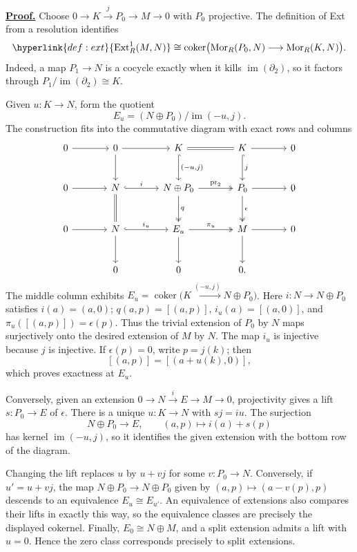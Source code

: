 \documentclass[11pt]{article}
\makeatletter
\newcommand{\afterblock}{\@afterindentfalse\@afterheading}
\newenvironment{demonstration}[1]{\par\noindent\hypertarget{proof:#1}{}{\color{burgundy}\hypersetup{linkcolor=burgundy}\hyperlink{#1}{\textbf{Proof.}}}\quad\ignorespaces}{\unskip\nobreak\hfill\qedsymbol\par\addvspace{5pt}\afterblock}
\newcommand{\usedby}[1]{\par\noindent{\small\textbf{Used in:} #1.}\par\afterblock}
\newcommand{\Mor}{\operatorname{Mor}}
\newcommand{\Extn}[3]{\hyperlink{def:ext}{\operatorname{Ext}^{#1}_{R}(#2,#3)}}
\newcommand{\im}{\operatorname{im}}
\newcommand{\coker}{\operatorname{coker}}
\makeatother
\begin{document}
\begin{demonstration}{thm:extensions}
Choose $0\to K\xrightarrow{j}P_0\to M\to0$ with $P_0$ projective. The definition of Ext from a resolution identifies
\begin{equation}
\label{eq:ext1-coker}\Extn{1}{M}{N}\cong
\coker\bigl(\Mor_R(P_0,N)\longrightarrow\Mor_R(K,N)\bigr).
\end{equation}
Indeed, a map $P_1\to N$ is a cocycle exactly when it kills $\im(\partial_2)$, so it factors through $P_1/\im(\partial_2)\cong K$.

Given $u:K\to N$, form the quotient
\[
E_u=(N\oplus P_0)/\im(-u,j).
\]
The construction fits into the commutative diagram with exact rows and columns
\[
\begin{tikzcd}[column sep=large,row sep=large]
0 \arrow[r] & 0 \arrow[r] \arrow[d]
& K \arrow[r,equal] \arrow[d,hook,"{(-u,j)}"]
& K \arrow[r] \arrow[d,hook,"j"] & 0\\
0 \arrow[r] & N \arrow[r,hook,"i"] \arrow[d,equal]
& N\oplus P_0 \arrow[r,two heads,"\mathrm{pr}_2"] \arrow[d,two heads,"q"]
& P_0 \arrow[r] \arrow[d,two heads,"\epsilon"] & 0\\
0 \arrow[r] & N \arrow[r,hook,"i_u"] \arrow[d]
& E_u \arrow[r,two heads,"\pi_u"] \arrow[d]
& M \arrow[r] \arrow[d] & 0\\
& 0 & 0 & 0.
\end{tikzcd}
\]
The middle column exhibits $E_u=\coker\bigl(K\xrightarrow{(-u,j)}N\oplus P_0\bigr)$. Here $i:N\to N\oplus P_0$ satisfies $i(a)=(a,0)$; $q(a,p)=[(a,p)]$, $i_u(a)=[(a,0)]$, and $\pi_u([(a,p)])=\epsilon(p)$. Thus the trivial extension of $P_0$ by $N$ maps surjectively onto the desired extension of $M$ by $N$. The map $i_u$ is injective because $j$ is injective. If $\epsilon(p)=0$, write $p=j(k)$; then
\[
[(a,p)]=[(a+u(k),0)],
\]
which proves exactness at $E_u$.

Conversely, given an extension $0\to N\xrightarrow{i}E\to M\to0$, projectivity gives a lift $s:P_0\to E$ of $\epsilon$. There is a unique $u:K\to N$ with $sj=iu$. The surjection
\[
N\oplus P_0\longrightarrow E,\qquad (a,p)\longmapsto i(a)+s(p)
\]
has kernel $\im(-u,j)$, so it identifies the given extension with the bottom row of the diagram.

Changing the lift replaces $u$ by $u+vj$ for some $v:P_0\to N$. Conversely, if $u'=u+vj$, the map $N\oplus P_0\to N\oplus P_0$ given by $(a,p)\mapsto(a-v(p),p)$ descends to an equivalence $E_u\cong E_{u'}$. An equivalence of extensions also compares their lifts in exactly this way, so the equivalence classes are precisely the displayed cokernel. Finally, $E_0\cong N\oplus M$, and a split extension admits a lift with $u=0$. Hence the zero class corresponds precisely to split extensions.
\end{demonstration}
\usedby{Example~\ref{ex:triangular}}
\end{document}
